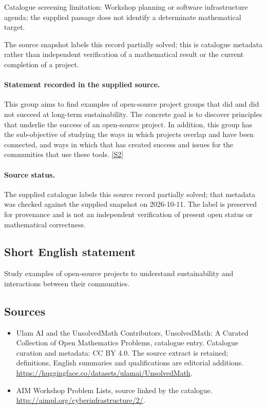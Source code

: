 \documentclass[11pt]{article}
\begin{document}
Catalogue screening limitation: Workshop planning or software infrastructure agenda; the supplied passage does not identify a determinate mathematical target.

The source snapshot labels this record partially solved; this is catalogue metadata rather than independent verification of a mathematical result or the current completion of a project.
\paragraph{Statement recorded in the supplied source.}
This group aims to find examples of open-source project groups that did and did not succeed at long-term sustainability. The concrete goal is to discover principles that underlie the success of an open-source project. In addition, this group has the sub-objective of studying the ways in which projects overlap and have been connected, and ways in which that has created success and issues for the communities that use these tools. \href{http://aimpl.org/cyberinfrastructure/2/}{[S2]}
\paragraph{Source status.}
The supplied catalogue labels this source record partially solved; that metadata was checked against the supplied snapshot on 2026-10-11. The label is preserved for provenance and is not an independent verification of present open status or mathematical correctness.
\subsection{Short English statement}
Study examples of open-source projects to understand sustainability and interactions between their communities.
\subsection{Sources}
\begin{itemize}
\item[S1] Ulam AI and the UnsolvedMath Contributors, UnsolvedMath: A Curated Collection of Open Mathematics Problems, catalogue entry. Catalogue curation and metadata: CC BY 4.0. The source extract is retained; definitions, English summaries and qualifications are editorial additions.
\url{https://huggingface.co/datasets/ulamai/UnsolvedMath}.
\item[S2] AIM Workshop Problem Lists, source linked by the catalogue.
\url{http://aimpl.org/cyberinfrastructure/2/}.
\end{itemize}
\end{document}
